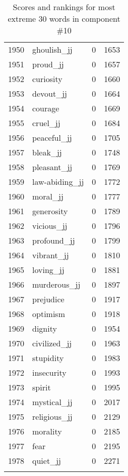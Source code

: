 \begin{longtable}[!htbp]{| rlr@{.}l |}
    1950 & ghoulish\_jj & 0 & 1653 \\
    1951 & proud\_jj & 0 & 1657 \\
    1952 & curiosity & 0 & 1660 \\
    1953 & devout\_jj & 0 & 1664 \\
    1954 & courage & 0 & 1669 \\
    1955 & cruel\_jj & 0 & 1684 \\
    1956 & peaceful\_jj & 0 & 1705 \\
    1957 & bleak\_jj & 0 & 1748 \\
    1958 & pleasant\_jj & 0 & 1769 \\
    1959 & law-abiding\_jj & 0 & 1772 \\
    1960 & moral\_jj & 0 & 1777 \\
    1961 & generosity & 0 & 1789 \\
    1962 & vicious\_jj & 0 & 1796 \\
    1963 & profound\_jj & 0 & 1799 \\
    1964 & vibrant\_jj & 0 & 1810 \\
    1965 & loving\_jj & 0 & 1881 \\
    1966 & murderous\_jj & 0 & 1897 \\
    1967 & prejudice & 0 & 1917 \\
    1968 & optimism & 0 & 1918 \\
    1969 & dignity & 0 & 1954 \\
    1970 & civilized\_jj & 0 & 1963 \\
    1971 & stupidity & 0 & 1983 \\
    1972 & insecurity & 0 & 1993 \\
    1973 & spirit & 0 & 1995 \\
    1974 & mystical\_jj & 0 & 2017 \\
    1975 & religious\_jj & 0 & 2129 \\
    1976 & morality & 0 & 2185 \\
    1977 & fear & 0 & 2195 \\
    1978 & quiet\_jj & 0 & 2271 \\
    \hline
    \caption{Scores and rankings for most extreme 30 words in component \#10} \\
\end{longtable}
